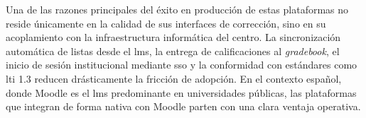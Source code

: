Una de las razones principales del éxito en producción de estas
plataformas no reside únicamente en la calidad de sus interfaces de
corrección, sino en su acoplamiento con la infraestructura informática del
centro. La sincronización automática de listas desde el \ac{lms}, la
entrega de calificaciones al \textit{gradebook}, el inicio de sesión
institucional mediante \acs{sso} y la conformidad con estándares como
\acs{lti} 1.3 reducen drásticamente la fricción de adopción. En el
contexto español, donde Moodle es el \acs{lms} predominante en
universidades públicas, las plataformas que integran de forma nativa con
Moodle parten con una clara ventaja operativa.
